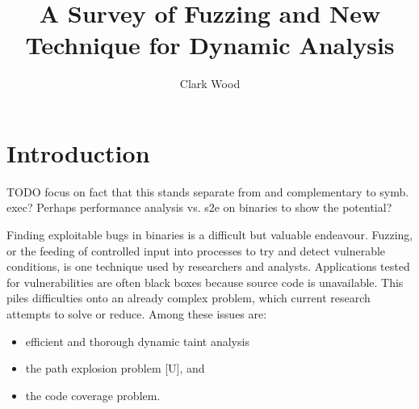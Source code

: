 \documentclass[11pt,expanded,copyright]{fsuthesis}
\title{A Survey of Fuzzing and New Technique for Dynamic Analysis}
\author{Clark Wood}
\begin{document}
\frontmatter
\maketitle
\makecommitteepage



\tableofcontents




\mainmatter

%

\chapter{Introduction}

TODO focus on fact that this stands separate from and complementary to symb. exec? Perhaps performance analysis vs. s2e on binaries to show the potential?

Finding exploitable bugs in binaries is a difficult but valuable endeavour. Fuzzing, or the feeding of controlled input into processes to try and detect vulnerable conditions, is one technique used by researchers and analysts. Applications tested for vulnerabilities are often black boxes because source code is unavailable. This piles difficulties onto an already complex problem, which current research attempts to solve or reduce. Among these issues are:
	\begin{itemize}
		\item efficient and thorough dynamic taint analysis
		\item the path explosion problem [U], and
		\item the code coverage problem. 
	\end{itemize}
\end{document}
